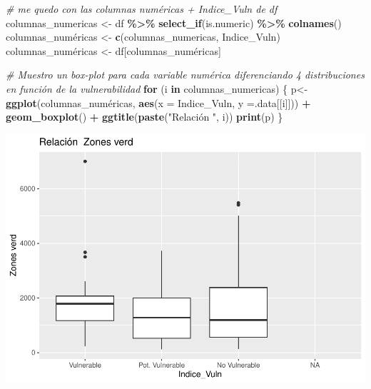 \documentclass[notspecified,article,submit,moreauthors,pdftex]{Definitions/mdpi}
\newenvironment{Shaded}{\begin{snugshade}}{\end{snugshade}}
\newcommand{\AttributeTok}[1]{\textcolor[rgb]{0.13,0.29,0.53}{#1}}
\newcommand{\CommentTok}[1]{\textcolor[rgb]{0.56,0.35,0.01}{\textit{#1}}}
\newcommand{\ControlFlowTok}[1]{\textcolor[rgb]{0.13,0.29,0.53}{\textbf{#1}}}
\newcommand{\FunctionTok}[1]{\textcolor[rgb]{0.13,0.29,0.53}{\textbf{#1}}}
\newcommand{\NormalTok}[1]{#1}
\newcommand{\OtherTok}[1]{\textcolor[rgb]{0.56,0.35,0.01}{#1}}
\newcommand{\SpecialCharTok}[1]{\textcolor[rgb]{0.81,0.36,0.00}{\textbf{#1}}}
\newcommand{\StringTok}[1]{\textcolor[rgb]{0.31,0.60,0.02}{#1}}
\begin{document}
\begin{Shaded}
\begin{Highlighting}[]
\CommentTok{\# me quedo con las columnas numéricas + Indice\_Vuln de df}
\NormalTok{columnas\_numericas }\OtherTok{\textless{}{-}}\NormalTok{ df }\SpecialCharTok{\%\textgreater{}\%}
  \FunctionTok{select\_if}\NormalTok{(is.numeric) }\SpecialCharTok{\%\textgreater{}\%}
  \FunctionTok{colnames}\NormalTok{()}
\NormalTok{columnas\_numéricas }\OtherTok{\textless{}{-}} \FunctionTok{c}\NormalTok{(columnas\_numericas, }\StringTok{\textquotesingle{}Indice\_Vuln\textquotesingle{}}\NormalTok{)}
\NormalTok{columnas\_numéricas }\OtherTok{\textless{}{-}}\NormalTok{ df[columnas\_numéricas]}

\CommentTok{\# Muestro un box{-}plot para cada variable numérica diferenciando 4 distribuciones en función de la vulnerabilidad}
\ControlFlowTok{for}\NormalTok{ (i }\ControlFlowTok{in}\NormalTok{ columnas\_numericas) \{}
\NormalTok{  p}\OtherTok{\textless{}{-}}\FunctionTok{ggplot}\NormalTok{(columnas\_numéricas, }\FunctionTok{aes}\NormalTok{(}\AttributeTok{x =}\NormalTok{ Indice\_Vuln, }\AttributeTok{y =}\NormalTok{.data[[i]])) }\SpecialCharTok{+}
    \FunctionTok{geom\_boxplot}\NormalTok{() }\SpecialCharTok{+} 
    \FunctionTok{ggtitle}\NormalTok{(}\FunctionTok{paste}\NormalTok{(}\StringTok{"Relación "}\NormalTok{, i))}
  \FunctionTok{print}\NormalTok{(p)}
\NormalTok{\}}
\end{Highlighting}
\end{Shaded}

\begin{center}\includegraphics{./figure/unnamed-chunk-23-1} \end{center}
\end{document}
